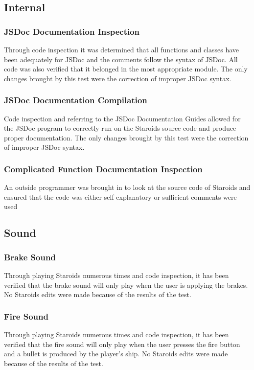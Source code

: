 \documentclass[12pt, titlepage]{article}
\begin{document}
\subsection{Internal}

\subsubsection{JSDoc Documentation Inspection}
Through code inspection it was determined that all functions and classes have been adequately for JSDoc and the comments follow the syntax of JSDoc. All code was also verified that it belonged in the most appropriate module. The only changes brought by this test were the correction of improper JSDoc syntax.
\subsubsection{JSDoc Documentation Compilation}
Code inspection and referring to the JSDoc Documentation Guides allowed for the JSDoc program to correctly run on the Staroids source code and produce proper documentation. The only changes brought by this test were the correction of improper JSDoc syntax.
\subsubsection{Complicated Function Documentation Inspection}
An outside programmer was brought in to look at the source code of Staroids and ensured that the code was either self explanatory or sufficient comments were used

\subsection{Sound}

\subsubsection{Brake Sound}
Through playing Staroids numerous times and code inspection, it has been verified that the brake sound will only play when the user is applying the brakes. No Staroids edits were made because of the results of the test.
\subsubsection{Fire Sound}
Through playing Staroids numerous times and code inspection, it has been verified that the fire sound will only play when the user presses the fire button and a bullet is produced by the player's ship. No Staroids edits were made because of the results of the test.
\end{document}
